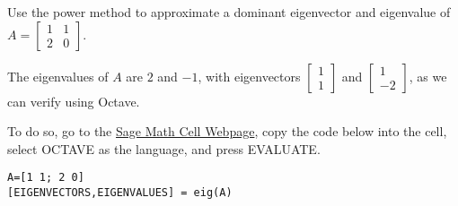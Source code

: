\documentclass{ximera}
\begin{document}
\begin{exploration}\label{exp:2x2PowerMethod}
Use the power method to approximate a dominant eigenvector and eigenvalue of $A = \left[ \begin{array}{rr}
1 & 1 \\
2 & 0
\end{array}\right]$.

The eigenvalues of $A$ are $2$ and $-1$, with eigenvectors $\left[ \begin{array}{rr}
  1 \\
  1
  \end{array}\right]$ and $\left[ \begin{array}{rr}
  1 \\
  -2
  \end{array}\right]$, as we can verify using Octave. 
  
To do so, go to the \href{https://sagecell.sagemath.org/}{Sage Math Cell Webpage}, copy the code below into the cell, select OCTAVE as the language, and press EVALUATE.

\begin{verbatim}
A=[1 1; 2 0]
[EIGENVECTORS,EIGENVALUES] = eig(A)
\end{verbatim}
  

\end{exploration}
\end{document}
